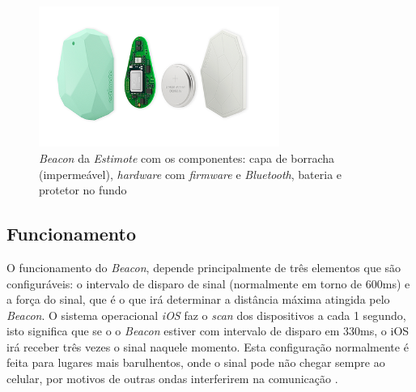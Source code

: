 \documentclass[
	12pt,
	oneside,
	a4paper,
	english,
	brazil,
]{abntex2}
\begin{document}
\begin{figure}[h]
\centering
\includegraphics[width=0.7\textwidth]{estimote-beacon}
    \caption{
        \emph{Beacon} da \emph{Estimote} com os componentes: capa de borracha (impermeável), \emph{hardware} com \emph{firmware} e \emph{Bluetooth}, bateria e protetor no fundo
    }
\end{figure}

\subsection{Funcionamento}

O funcionamento do \emph{Beacon}, depende principalmente de três elementos que são configuráveis: o intervalo de disparo de sinal (normalmente em torno de 600ms) e a força do sinal, que é o que irá determinar a distância máxima atingida pelo \emph{Beacon}. O sistema operacional \emph{iOS} faz o \emph{scan} dos dispositivos a cada 1 segundo, isto significa que se o o \emph{Beacon} estiver com intervalo de disparo em 330ms, o iOS irá receber três vezes o sinal naquele momento. Esta configuração normalmente é feita para lugares mais barulhentos, onde o sinal pode não chegar sempre ao celular, por motivos de outras ondas interferirem na comunicação \cite{beacon-how-it-works-estimote}.
\end{document}

